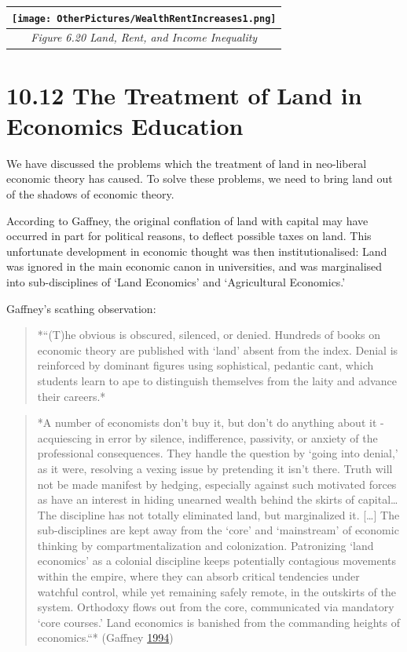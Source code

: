 \documentclass[]{tufte-handout}
\begin{document}
\begin{longtable}[]{@{}c@{}}
\toprule
\texttt{[image: OtherPictures/WealthRentIncreases1.png]}\tabularnewline
\midrule
\endhead
\emph{Figure 6.20 Land, Rent, and Income Inequality}\tabularnewline
\bottomrule
\end{longtable}

\hypertarget{the-treatment-of-land-in-economics-education}{%
\section{10.12 The Treatment of Land in Economics
Education}\label{the-treatment-of-land-in-economics-education}}

We have discussed the problems which the treatment of land in
neo-liberal economic theory has caused. To solve these problems, we need
to bring land out of the shadows of economic theory.

According to Gaffney, the original conflation of land with capital may
have occurred in part for political reasons, to deflect possible taxes
on land. This unfortunate development in economic thought was then
institutionalised: Land was ignored in the main economic canon in
universities, and was marginalised into sub-disciplines of `Land
Economics' and `Agricultural Economics.'

Gaffney's scathing observation:

\begin{quote}
*``(T)he obvious is obscured, silenced, or denied. Hundreds of books on
economic theory are published with `land' absent from the index. Denial
is reinforced by dominant figures using sophistical, pedantic cant,
which students learn to ape to distinguish themselves from the laity and
advance their careers.*
\end{quote}

\begin{quote}
*A number of economists don't buy it, but don't do anything about it -
acquiescing in error by silence, indifference, passivity, or anxiety of
the professional consequences. They handle the question by `going into
denial,' as it were, resolving a vexing issue by pretending it isn't
there. Truth will not be made manifest by hedging, especially against
such motivated forces as have an interest in hiding unearned wealth
behind the skirts of capital\ldots{} The discipline has not totally
eliminated land, but marginalized it. {[}\ldots{}{]} The sub-disciplines
are kept away from the `core' and `mainstream' of economic thinking by
compartmentalization and colonization. Patronizing `land economics' as a
colonial discipline keeps potentially contagious movements within the
empire, where they can absorb critical tendencies under watchful
control, while yet remaining safely remote, in the outskirts of the
system. Orthodoxy flows out from the core, communicated via mandatory
`core courses.' Land economics is banished from the commanding heights
of economics.``* (Gaffney \protect\hyperlink{ref-Gaffney1994}{1994})
\end{quote}
\end{document}
